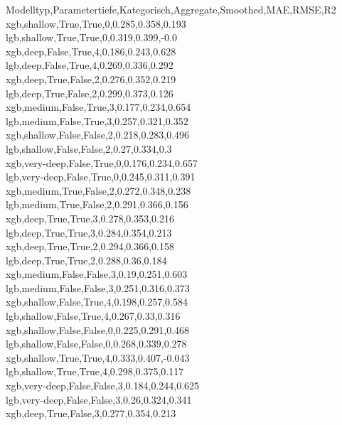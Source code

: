 
Modelltyp,Parametertiefe,Kategorisch,Aggregate,Smoothed,MAE,RMSE,R2 \\
xgb,shallow,True,True,0,0.285,0.358,0.193 \\
lgb,shallow,True,True,0,0.319,0.399,-0.0 \\
xgb,deep,False,True,4,0.186,0.243,0.628 \\
lgb,deep,False,True,4,0.269,0.336,0.292 \\
xgb,deep,True,False,2,0.276,0.352,0.219 \\
lgb,deep,True,False,2,0.299,0.373,0.126 \\
xgb,medium,False,True,3,0.177,0.234,0.654 \\
lgb,medium,False,True,3,0.257,0.321,0.352 \\
xgb,shallow,False,False,2,0.218,0.283,0.496 \\
lgb,shallow,False,False,2,0.27,0.334,0.3 \\
xgb,very-deep,False,True,0,0.176,0.234,0.657 \\
lgb,very-deep,False,True,0,0.245,0.311,0.391 \\
xgb,medium,True,False,2,0.272,0.348,0.238 \\
lgb,medium,True,False,2,0.291,0.366,0.156 \\
xgb,deep,True,True,3,0.278,0.353,0.216 \\
lgb,deep,True,True,3,0.284,0.354,0.213 \\
xgb,deep,True,True,2,0.294,0.366,0.158 \\
lgb,deep,True,True,2,0.288,0.36,0.184 \\
xgb,medium,False,False,3,0.19,0.251,0.603 \\
lgb,medium,False,False,3,0.251,0.316,0.373 \\
xgb,shallow,False,True,4,0.198,0.257,0.584 \\
lgb,shallow,False,True,4,0.267,0.33,0.316 \\
xgb,shallow,False,False,0,0.225,0.291,0.468 \\
lgb,shallow,False,False,0,0.268,0.339,0.278 \\
xgb,shallow,True,True,4,0.333,0.407,-0.043 \\
lgb,shallow,True,True,4,0.298,0.375,0.117 \\
xgb,very-deep,False,False,3,0.184,0.244,0.625 \\
lgb,very-deep,False,False,3,0.26,0.324,0.341 \\
xgb,deep,True,False,3,0.277,0.354,0.213 \\
